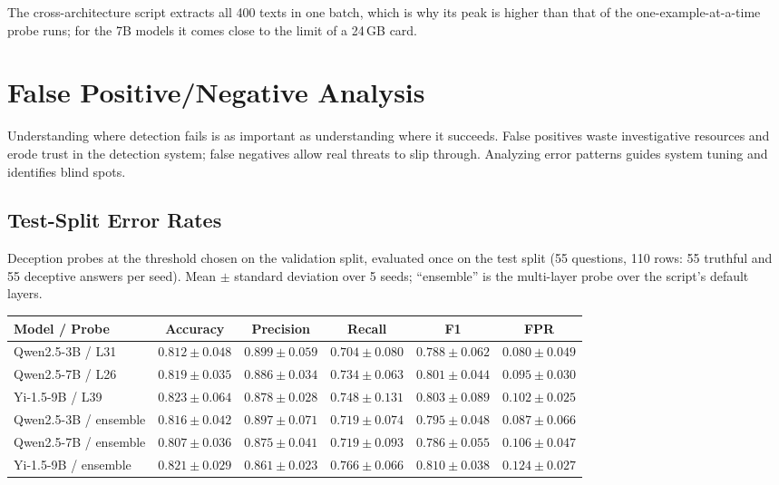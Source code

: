 \documentclass[11pt,letterpaper]{article}
\let\origsubsection\subsection
\renewcommand{\subsection}{\needspace{8\baselineskip}\origsubsection}}
\begin{document}
The cross-architecture script extracts all 400 texts in one batch, which is why its peak is higher than that of the one-example-at-a-time probe runs; for the 7B models it comes close to the limit of a 24\,GB card.

\section{False Positive/Negative Analysis}
\label{sec:fpfn}

Understanding where detection fails is as important as understanding where it succeeds. False positives waste investigative resources and erode trust in the detection system; false negatives allow real threats to slip through. Analyzing error patterns guides system tuning and identifies blind spots.

\subsection{Test-Split Error Rates}

Deception probes at the threshold chosen on the validation split, evaluated once on the test split (55 questions, 110 rows: 55 truthful and 55 deceptive answers per seed). Mean $\pm$ standard deviation over 5 seeds; ``ensemble'' is the multi-layer probe over the script's default layers.

\begin{center}
\begin{tabular}{lccccc}
\toprule
\textbf{Model / Probe} & \textbf{Accuracy} & \textbf{Precision} & \textbf{Recall} & \textbf{F1} & \textbf{FPR} \\
\midrule
\rowcolor{backgroundgray} Qwen2.5-3B / L31 & $0.812 \pm 0.048$ & $0.899 \pm 0.059$ & $0.704 \pm 0.080$ & $0.788 \pm 0.062$ & $0.080 \pm 0.049$ \\
Qwen2.5-7B / L26 & $0.819 \pm 0.035$ & $0.886 \pm 0.034$ & $0.734 \pm 0.063$ & $0.801 \pm 0.044$ & $0.095 \pm 0.030$ \\
\rowcolor{backgroundgray} Yi-1.5-9B / L39 & $0.823 \pm 0.064$ & $0.878 \pm 0.028$ & $0.748 \pm 0.131$ & $0.803 \pm 0.089$ & $0.102 \pm 0.025$ \\
Qwen2.5-3B / ensemble & $0.816 \pm 0.042$ & $0.897 \pm 0.071$ & $0.719 \pm 0.074$ & $0.795 \pm 0.048$ & $0.087 \pm 0.066$ \\
\rowcolor{backgroundgray} Qwen2.5-7B / ensemble & $0.807 \pm 0.036$ & $0.875 \pm 0.041$ & $0.719 \pm 0.093$ & $0.786 \pm 0.055$ & $0.106 \pm 0.047$ \\
Yi-1.5-9B / ensemble & $0.821 \pm 0.029$ & $0.861 \pm 0.023$ & $0.766 \pm 0.066$ & $0.810 \pm 0.038$ & $0.124 \pm 0.027$ \\
\bottomrule
\end{tabular}
\end{center}
\end{document}
